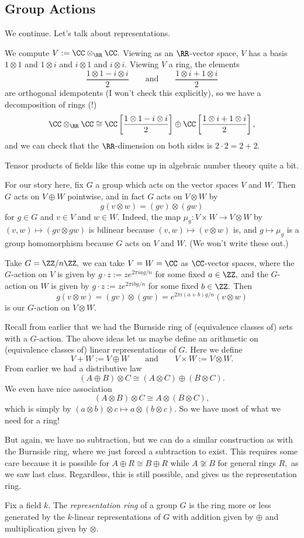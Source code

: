 \documentclass[../notes.tex]{subfiles}
\begin{document}
\subsection{Group Actions}
We continue. Let's talk about representations.
\begin{ex}
	We compute $V:=\CC\otimes_\RR\CC.$ Viewing as an $\RR$-vector space, $V$ has a basis $1\otimes 1$ and $1\otimes i$ and $i\otimes1$ and $i\otimes i.$ Viewing $V$ a ring, the elements
	\[\frac{1\otimes1-i\otimes i}2\qquad\text{and}\qquad\frac{1\otimes i+1\otimes i}2\]
	are orthogonal idempotents (I won't check this explicitly), so we have a decomposition of rings (!)
	\[\CC\otimes_\RR\CC\cong\CC\left[\frac{1\otimes1-i\otimes i}2\right]\oplus\CC\left[\frac{1\otimes i+1\otimes i}2\right],\]
	and we can check that the $\RR$-dimension on both sides is $2\cdot2=2+2.$
\end{ex}
\begin{remark}
	Tensor products of fields like this come up in algebraic number theory quite a bit.
\end{remark}
For our story here, fix $G$ a group which acts on the vector spaces $V$ and $W.$ Then $G$ acts on $V\oplus W$ pointwise, and in fact $G$ acts on $V\otimes W$ by
\[g(v\otimes w)=(gv)\otimes(gw)\]
for $g\in G$ and $v\in V$ and $w\in W.$ Indeed, the map $\mu_g:V\times W\to V\otimes W$ by $(v,w)\mapsto(gv\otimes gw)$ is bilinear because $(v,w)\mapsto(v\otimes w)$ is, and $g\mapsto\mu_g$ is a group homomorphism because $G$ acts on $V$ and $W.$ (We won't write these out.)
\begin{example}
	Take $G=\ZZ/n\ZZ,$ we can take $V=W=\CC$ as $\CC$-vector spaces, where the $G$-action on $V$ is given by $g\cdot z:=ze^{2\pi iag/n}$ for some fixed $a\in\ZZ,$ and the $G$-action on $W$ is given by $g\cdot z:=ze^{2\pi ibg/n}$ for some fixed $b\in\ZZ.$ Then
	\[g(v\otimes w)=(gv)\otimes(gw)=e^{2\pi i(a+b)g/n}(v\otimes w)\]
	is our $G$-action on $V\otimes W.$
\end{example}
Recall from earlier that we had the Burnside ring of (equivalence classes of) sets with a $G$-action. The above ideas let us maybe define an arithmetic on (equivalence classes of) linear representations of $G.$ Here we define
\[V+W:=V\oplus W\qquad\text{and}\qquad V\times W:=V\otimes W.\]
From earlier we had a distributive law
\[(A\oplus B)\otimes C\cong(A\otimes C)\oplus(B\otimes C).\]
We even have nice association
\[(A\otimes B)\otimes C\cong A\otimes(B\otimes C),\]
which is simply by $(a\otimes b)\otimes c\mapsto a\otimes (b\otimes c).$ So we have most of what we need for a ring!

But again, we have no subtraction, but we can do a similar construction as with the Burnside ring, where we just forced a subtraction to exist. This requires some care because it is possible for $A\oplus R\cong B\oplus R$ while $A\not\cong B$ for general rings $R,$ as we saw last class. Regardless, this is still possible, and gives us the representation ring.
\begin{definition}
	Fix a field $k.$ The \textit{representation ring} of a group $G$ is the ring more or less generated by the $k$-linear representations of $G$ with addition given by $\oplus$ and multiplication given by $\otimes.$
\end{definition}
\end{document}
